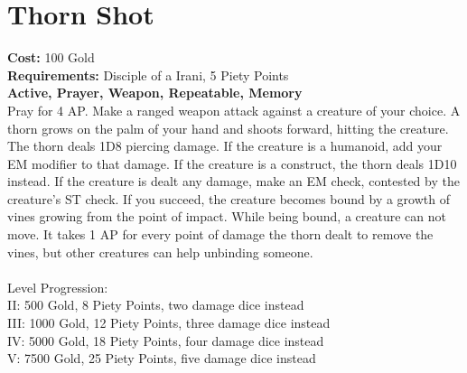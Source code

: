 \section{Thorn Shot}
\textbf{Cost:} 100 Gold\\
\textbf{Requirements:} Disciple of a Irani, 5 Piety Points \\
\textbf{Active, Prayer, Weapon, Repeatable, Memory}\\
Pray for 4 AP. Make a ranged weapon attack against a creature of your choice. A thorn grows on the palm of your hand and shoots forward, hitting the creature. The thorn deals 1D8 piercing damage. If the creature is a humanoid, add your EM modifier to that damage. If the creature is a construct, the thorn deals 1D10 instead. If the creature is dealt any damage, make an EM check, contested by the creature's ST check. If you succeed, the creature becomes bound by a growth of vines growing from the point of impact. While being bound, a creature can not move. It takes 1 AP for every point of damage the thorn dealt to remove the vines, but other creatures can help unbinding someone.\\
\\
Level Progression:\\
II: 500 Gold, 8 Piety Points, two damage dice instead\\
III: 1000 Gold, 12 Piety Points, three damage dice instead\\
IV: 5000 Gold, 18 Piety Points, four damage dice instead\\
V: 7500 Gold, 25 Piety Points, five damage dice instead\\